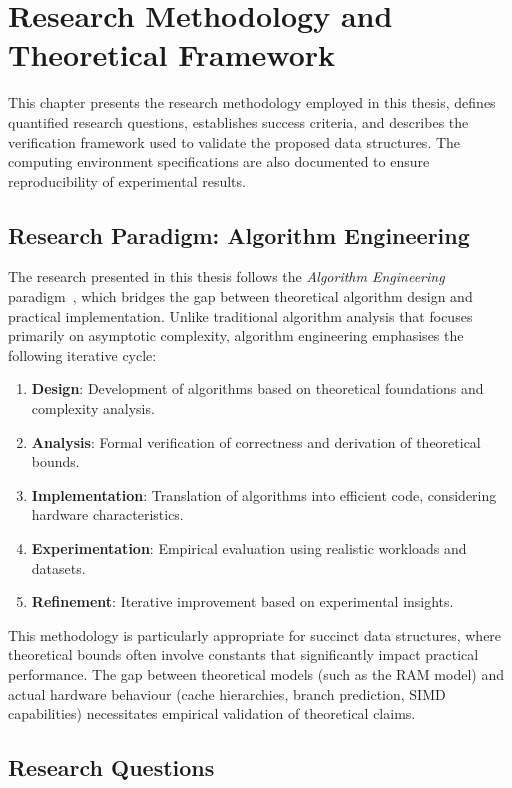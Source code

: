 \chapter{Research Methodology and Theoretical Framework}
\label{chap:methodology}

This chapter presents the research methodology employed in this thesis, defines quantified research questions, establishes success criteria, and describes the verification framework used to validate the proposed data structures. The computing environment specifications are also documented to ensure reproducibility of experimental results.

\section{Research Paradigm: Algorithm Engineering}

The research presented in this thesis follows the \textit{Algorithm Engineering} paradigm~\cite{Sanders_2009}, which bridges the gap between theoretical algorithm design and practical implementation. Unlike traditional algorithm analysis that focuses primarily on asymptotic complexity, algorithm engineering emphasises the following iterative cycle:

\begin{enumerate}
    \item \textbf{Design}: Development of algorithms based on theoretical foundations and complexity analysis.
    \item \textbf{Analysis}: Formal verification of correctness and derivation of theoretical bounds.
    \item \textbf{Implementation}: Translation of algorithms into efficient code, considering hardware characteristics.
    \item \textbf{Experimentation}: Empirical evaluation using realistic workloads and datasets.
    \item \textbf{Refinement}: Iterative improvement based on experimental insights.
\end{enumerate}

This methodology is particularly appropriate for succinct data structures, where theoretical bounds often involve constants that significantly impact practical performance. The gap between theoretical models (such as the RAM model) and actual hardware behaviour (cache hierarchies, branch prediction, SIMD capabilities) necessitates empirical validation of theoretical claims.

\section{Research Questions}

